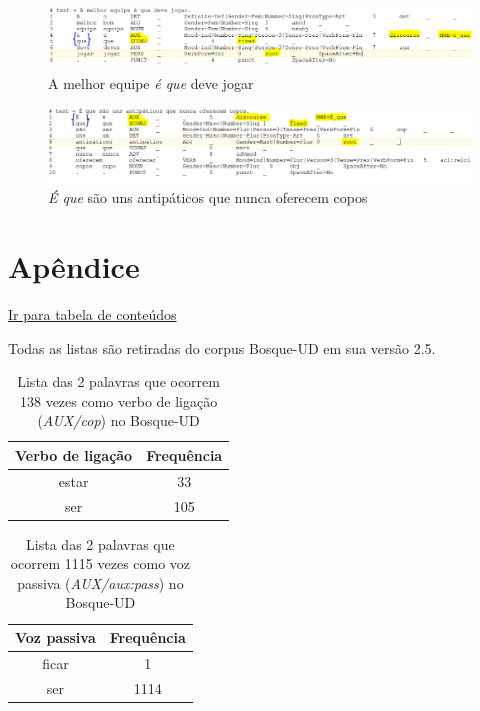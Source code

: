 \documentclass[output=paper,colorlinks,citecolor=brown]{langscibook}
\begin{document}
		\begin{figure}
    	\centering
    	\includegraphics[width=\textwidth,height=\textheight,keepaspectratio]{imagesDrive/image16.png}
    	\caption{A melhor equipe \emph{é que} deve jogar}
    	\label{fig:equeMWE2}
    	\end{figure}{}

	\begin{figure}
    	\centering
    	\includegraphics[width=\textwidth,height=\textheight,keepaspectratio]{imagesDrive/image71.PNG}
    	\caption{\emph{É que} são uns antipáticos que nunca oferecem copos}
    	\label{fig:equeMWE3}
    	\end{figure}{}

\chapter{Apêndice}

	\hyperlink{toc}{Ir para tabela de conteúdos\\}

	Todas as listas são retiradas do corpus Bosque-UD em sua versão 2.5.
	
	\begin{table}[]
		\centering
		\begin{tabular}{|c|c|}
			\hline
			\textbf{Verbo de ligação} & \textbf{Frequência} \\\hline
			estar & 33\\\hline
			ser & 105\\\hline
		\end{tabular}
		\caption{Lista das 2 palavras que ocorrem 138 vezes como verbo de ligação (\emph{AUX/cop}) no Bosque-UD}
		\label{tab:verbosdeligacao}
	\end{table}

	\begin{table}[]
		\centering
		\begin{tabular}{|c|c|}
			\hline
			\textbf{Voz passiva} & \textbf{Frequência} \\\hline
			ficar & 1\\\hline
			ser & 1114\\\hline
		\end{tabular}
		\caption{Lista das 2 palavras que ocorrem 1115 vezes como voz passiva (\emph{AUX/aux:pass}) no Bosque-UD}
		\label{tab:vozpassiva}
	\end{table}
\end{document}
